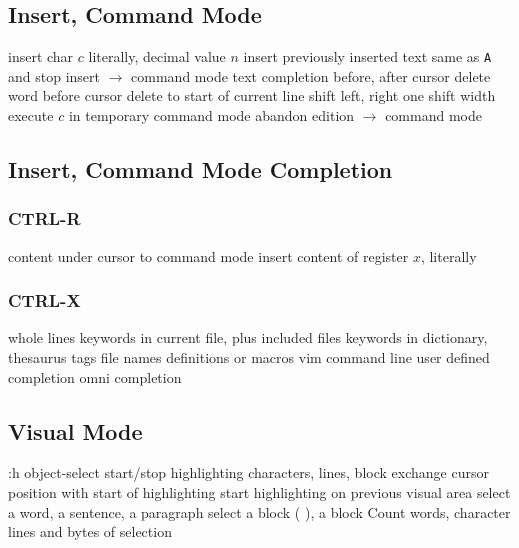 \subsection{Insert, Command Mode}	{}
	{insert char $c$ literally, decimal value $n$}
	{insert previously inserted text}
	{same as {\tt\ctrl A} and stop insert $\to$ command mode}
	{text completion before, after cursor}
	{delete word before cursor}
	{delete to start of current line}
	{shift left, right one shift width}
	{execute $c$ in temporary command mode}
	{abandon edition $\to$ command mode}

\subsection{Insert, Command Mode Completion}	{}
\subsubsection{CTRL-R}{}
	{content under cursor to command mode}
	{insert content of register $x$, literally}
\subsubsection{CTRL-X}{}
	{whole lines}
	{keywords in current file, plus included files}
	{keywords in dictionary, thesaurus}
\cmdS{\ctrl{}X\ctrl{}]}	{tags}
	{file names}
	{definitions or macros}
	{vim command line}
	{user defined completion}
	{omni completion}

\subsection{Visual Mode}	{:h object-select}
	{start/stop highlighting characters, lines, block}
	{exchange cursor position with start of highlighting}
	{start highlighting on previous visual area}
	{select a word, a sentence, a paragraph}
	{select a block ( ), a block {\tt\lapos}	{\tt\rapos}}
	{Count words, character lines and bytes of selection}

